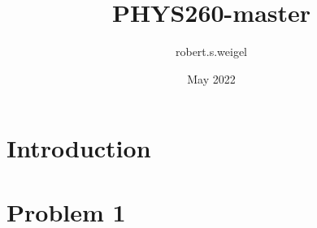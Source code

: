 \documentclass{article}
\title{PHYS260-master}
\author{robert.s.weigel }
\date{May 2022}
\begin{document}
\maketitle

\section{Introduction}
\section{Problem 1}
\end{document}
